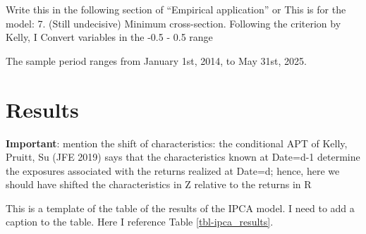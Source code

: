 \documentclass[
  12pt,
  a4paper,
  openany]{scrbook}
\begin{document}
Write this in the following section of ``Empirical application'' or This
is for the model: 7. (Still undecisive) Minimum cross-section. Following
the criterion by Kelly, I Convert variables in the -0.5 - 0.5 range

The sample period ranges from January 1st, 2014, to May 31st, 2025.


\chapter{Results}\label{results}

\textbf{Important}: mention the shift of characteristics: the
conditional APT of Kelly, Pruitt, Su (JFE 2019) says that the
characteristics known at Date=d-1 determine the exposures associated
with the returns realized at Date=d; hence, here we should have shifted
the characteristics in Z relative to the returns in R

This is a template of the table of the results of the IPCA model. I need
to add a caption to the table. Here I reference Table
\ref{tbl-ipca_results}.
\end{document}
